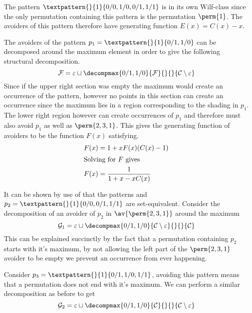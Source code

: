 The pattern \(\textpattern{}{1}{0/0,1/0,0/1,1/1}\) is in its own
Wilf-class since the only permutation containing this pattern is
the permutation \(\perm{1}\). The avoiders of this pattern therefore
have generating function \(E(x) = C(x)-x\).

The avoiders of the pattern \(p_1 = \textpattern{}{1}{0/1,1/0}\) can be
decomposed around the maximum element in order to give the following
structural decomposition.
\begin{equation*}
    \mathcal{F} = \varepsilon \sqcup \decompmax{0/1,1/0}{\mathcal{F}}{}{}{\mathcal{C}\setminus\varepsilon}
\end{equation*}
Since if the upper right section was empty the maximum would create an
occurrence of the pattern, however no points in this section can create
an occurrence since the maximum lies in a region corresponding to the
shading in \(p_1\). The lower right region however can create occurrences
of \(p_1\) and therefore must also avoid \(p_1\) as well as \(\perm{2,3,1}\).
This gives the generating function of avoiders to be the function \(F(x)\)
satisfying.
\begin{align*}
    F(x) &= 1 + xF(x)(C(x)-1) \\
    \shortintertext{Solving for \(F\) gives}
    F(x) &= \frac{1}{1+x-xC(x)}
\end{align*}

It can be shown by use of  that the patterns
 and \(p_2 = \textpattern{}{1}{0/0,0/1,1/1}\) are
set-equivalent. Consider the decomposition of an avoider of \(p_2\) in
\(\av{\perm{2,3,1}}\) around the maximum
\begin{equation*}
    \mathcal{G}_1 =\varepsilon \sqcup \decompmax{0/1,1/0}{\mathcal{C}\setminus\varepsilon}{}{}{\mathcal{C}}
\end{equation*}
This can be explained succinctly by the fact that a permutation containing
\(p_2\) starts with it's maximum, by not allowing the left part of the
\(\perm{2,3,1}\) avoider to be empty we prevent an occurrence from ever happening.

Consider \(p_3 = \textpattern{}{1}{0/1,1/0,1/1}\), avoiding this pattern
means that a permutation does not end with it's maximum. We can perform a similar
decomposition as before to get
\begin{equation*}
    \mathcal{G}_2 =\varepsilon \sqcup \decompmax{0/1,1/0}{\mathcal{C}}{}{}{\mathcal{C}\setminus\varepsilon}
\end{equation*}

